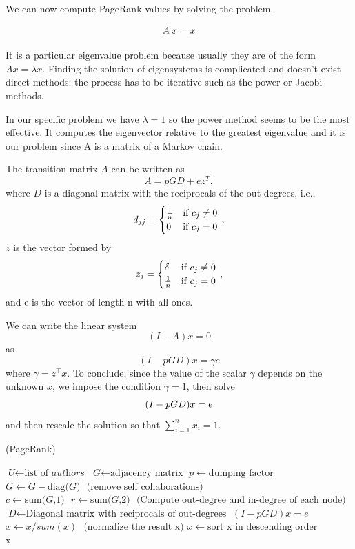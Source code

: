 \documentclass[]{usiinfbachelorproject}
\newcommand\transp[1]{{#1}^{\top}}
\begin{document}
We can now compute PageRank values by solving the problem. 

\begin{equation}\notag
A\:x = x
\end{equation}

It is a particular eigenvalue problem because usually they are of the form $Ax=\lambda x$. Finding the solution of eigensystems is complicated and doesn't exist direct methods; the process has to be iterative such as the power or Jacobi methods.

In our specific problem we have $\lambda = 1$ so the power method seems to be the most effective. It computes the eigenvector relative to the greatest eigenvalue and it is our problem since A is a matrix of a Markov chain.

The transition matrix $A$ can be written as
$$A = pGD+ez^{T}, $$
where $D$ is a diagonal matrix with the reciprocals of the out-degrees, i.e.,
\begin{equation}\notag
d_{jj} = 
\begin{cases}
\frac{1}{n} & \text{if } c_{j} \neq 0\\
0 & \text{if } c_{j} = 0
\end{cases} \,,
\end{equation}
$z$ is the vector formed by
\begin{equation}\notag
z_{j} = 
\begin{cases}
\delta & \text{if } c_{j} \neq 0\\
\frac{1}{n} & \text{if } c_{j} = 0
\end{cases} \,,
\end{equation}
and e is the vector of length n with all ones.

We can write the linear system
$$(I-A)x=0$$
as
$$(I - pGD)x = \gamma e$$
where $\gamma = \transp{z}x$.
To conclude, since the value of the scalar $\gamma$ depends on the unknown $x$, we impose the condition $\gamma = 1$, then solve
\begin{equation}\notag
(I - pGD)x = e
\end{equation}
and then rescale the solution so that $\sum\limits_{i=1}^{n} x_i = 1$.

\begin{algorithm}
\caption{ (PageRank)}\label{pagerank}
\begin{algorithmic}[1]
\State $\textit{U} \gets \text{list of }\textit{authors}$
\State $\textit{G} \gets \text{adjacency matrix}$
\State $p \gets \text{dumping factor}$
\State $\textit{G} \gets \textit{G} - \text{diag(}\textit{G}\text{)} \: \: \: \text{(remove self collaborations)}$
\State $\textit{c} \gets \text{sum(}\textit{G}\text{,1)} \:\:\: \textit{r} \gets \text{sum(}\textit{G}\text{,2)} \:\:\: \text{(Compute out-degree and in-degree of each node)}$
\State $\textit{D} \gets \text{Diagonal matrix with reciprocals of out-degrees}$
\State $(I - pGD)x = e$
\State $x \gets x / sum(x) \: \:\: \text{(normalize the result x)}$
\State $x \gets \text{sort x in descending order}$\\
\Return x
\EndProcedure
\end{algorithmic}
\end{algorithm}
\end{document}

